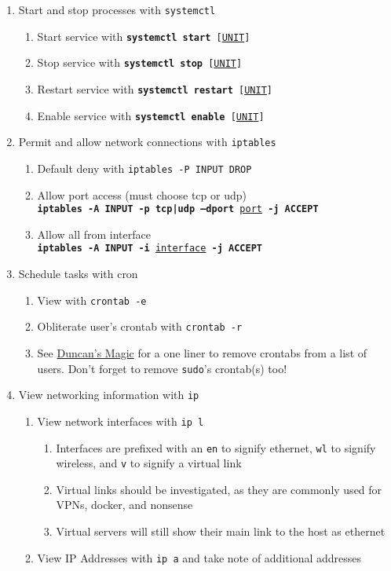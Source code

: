 \documentclass[12pt,letterpaper]{article}
\def\code#1{\textcolor{iris}{\texttt{#1}}}
\def\bf#1{\textbf{#1}}
\def\ul#1{\underline{#1}}
\begin{document}
\begin{enumerate}
	\item Start and stop processes with \code{systemctl}
		\begin{enumerate}
			\item Start service with \code{\bf{systemctl start} [\ul{UNIT}]}
			\item Stop service with \code{\bf{systemctl stop} [\ul{UNIT}]}
			\item Restart service with \code{\bf{systemctl restart} [\ul{UNIT}]}
			\item Enable service with \code{\bf{systemctl enable} [\ul{UNIT}]}
		\end{enumerate}
	\item Permit and allow network connections with \code{iptables}
		\begin{enumerate}
			\item Default deny with \code{iptables -P INPUT DROP}
			\item Allow port access (must choose tcp or udp) \\
				\code{\bf{iptables -A INPUT -p tcp|udp --dport} \ul{port} \bf{-j ACCEPT}}
			\item Allow all from interface \\
				\code{\bf{iptables -A INPUT -i} \ul{interface} \bf{-j ACCEPT}}
		\end{enumerate}
	\item Schedule tasks with cron
		\begin{enumerate}
			\item View with \code{crontab -e}
			\item Obliterate user's crontab with \code{crontab -r}
			\item See \hyperref[subsec:dmagic]{Duncan's Magic} for a one liner to remove crontabs from a list of users. Don't forget to remove \code{sudo}'s crontab(s) too!
		\end{enumerate}
	\item View networking information with \code{ip}
		\begin{enumerate}
			\item View network interfaces with \code{ip l}
				\begin{enumerate}
					\item Interfaces are prefixed with an \code{en} to signify ethernet, \code{wl} to signify wireless, and \code{v} to signify a virtual link
					\item Virtual links should be investigated, as they are commonly used for VPNs, docker, and nonsense
					\item Virtual servers will still show their main link to the host as ethernet
				\end{enumerate}
			\item View IP Addresses with \code{ip a} and take note of additional addresses
		\end{enumerate}
\end{enumerate}
\end{document}
